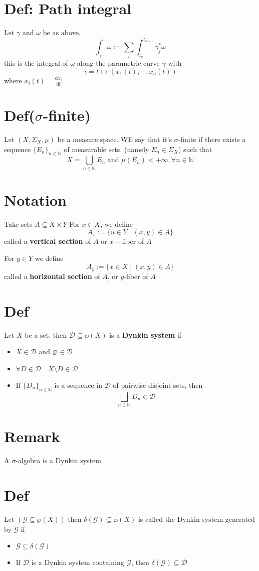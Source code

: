 \documentclass{article}
\begin{document}
\section{Def: Path integral}
\label{Def 52.2}
Let $\gamma$ and $\omega$ be as above.
$$\int_\gamma\omega:=\sum\limits_i\int_{t_k}^{t_{k+1}}\gamma_j^*\omega$$
this is the integral of $\omega$ along the parametric curve $\gamma$ with
$$\gamma=t\mapsto(x_1(t),\cdots,x_n(t))$$
where $x_i(t)=\frac{\text{d}x_i}{\text{d}t}$
\section{Def($\sigma$-finite)}
Let $(X,\Sigma_X,\mu)$ be a measure space. WE say that it's $\sigma$-finite if there exists a sequence $\{E_n\}_{n\in \mathbb{N}}$ of measurable sets. (namely $E_n\in \Sigma_X$) such that $$X=\bigcup\limits_{n\in \mathbb{N}}E_n\text{ and }\mu(E_n)<+\infty, \forall n\in \mathbb{N}$$
\section{Notation}
Take sets $A\subseteq X\times Y$ For $x\in X$, we define
$$A_x:=\{u\in Y\mid(x,y)\in A\}$$
called a \textbf{vertical section} of $A$ or $x-$fiber of $A$

For $y\in Y$ we define
$$A_y:=\{x\in X\mid(x,y)\in A\}$$
called a \textbf{horizontal section} of $A$, or $y$-fiber of $A$
\section{Def}
Let $X$ be a set. then $\mathscr{D}\subseteq\wp(X)$ is a \textbf{Dynkin system} if 
\begin{itemize}
    \item $X\in \mathscr{D}$ and $\varnothing\in \mathscr{D}$
    \item $\forall D\in \mathscr{D}\quad X\setminus D\in \mathscr{D}$
    \item If $\{D_n\}_{n\in \mathbb{N}}$ is a sequence in $\mathscr{D}$ of pairwise disjoint sets, then $$\bigsqcup\limits_{n\in \mathbb{N}}D_n\in \mathscr{D}$$
\end{itemize}
\section*{Remark}
A $\sigma$-algebra is a Dynkin system
\section{Def}
Let $(\mathcal{G}\subseteq\wp(X))$ then $\delta(\mathcal{G})\subseteq\wp(X)$ is called the Dynkin system generated by $\mathcal{G}$ if \begin{itemize}
    \item $\mathcal{G}\subseteq\delta(\mathcal{G})$
    \item If $\mathscr{D}$ is a Dynkin system containing $\mathcal{G}$, then $\delta(\mathcal{G})\subseteq\mathscr{D}$
\end{itemize}
\end{document}
